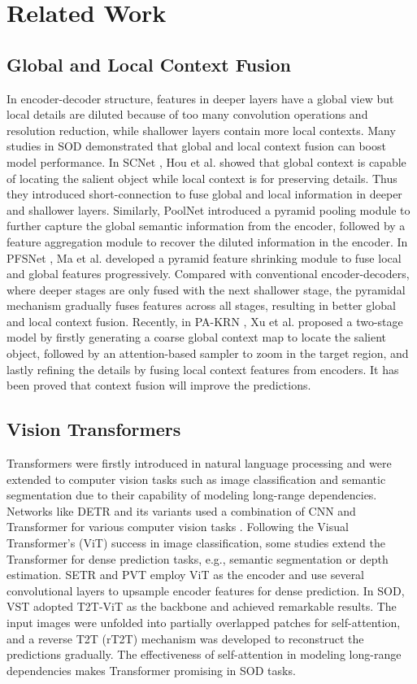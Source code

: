 \documentclass[letterpaper]{article} \usepackage{aaai22}  \usepackage{times}  \usepackage{helvet}  \usepackage{courier}  \usepackage[hyphens]{url}  \usepackage{graphicx} \urlstyle{rm} \def\UrlFont{\rm}  \usepackage{natbib}  \usepackage{caption} \DeclareCaptionStyle{ruled}{labelfont=normalfont,labelsep=colon,strut=off} \frenchspacing  \setlength{\pdfpagewidth}{8.5in}  \setlength{\pdfpageheight}{11in}  \usepackage{algorithm}
\begin{document}
\section{Related Work}
\subsection{Global and Local Context Fusion}
In encoder-decoder structure, features in deeper layers have a global view but local details are diluted because of too many convolution operations and resolution reduction, while shallower layers contain more local contexts. Many studies in SOD demonstrated that global and local context fusion can boost model performance. In SCNet \cite{SCNET}, Hou et al. showed that global context is capable of locating the salient object while local context is for preserving details. Thus they introduced short-connection to fuse global and local information in deeper and shallower layers. Similarly, PoolNet \cite{POOLNET} introduced a pyramid pooling module to further capture the global semantic information from the encoder, followed by a feature aggregation module to recover the diluted information in the encoder. In PFSNet \cite{PFSNET}, Ma et al. developed a pyramid feature shrinking module to fuse local and global features progressively. Compared with conventional encoder-decoders, where deeper stages are only fused with the next shallower stage, the pyramidal mechanism gradually fuses features across all stages, resulting in better global and local context fusion. Recently, in PA-KRN \cite{PAKRN}, Xu et al. proposed a two-stage model by firstly generating a coarse global context map to locate the salient object, followed by an attention-based sampler to zoom in the target region, and lastly refining the details by fusing local context features from encoders. It has been proved that context fusion will improve the predictions.

\subsection{Vision Transformers}
Transformers were firstly introduced in natural language processing \cite{ATTN, BERT, ALBERT} and were extended to computer vision tasks such as image classification \cite{16X16} and semantic segmentation \cite{SETR} due to their capability of modeling long-range dependencies. Networks like DETR \cite{DETR} and its variants \cite{UPDETR, HOTR} used a combination of CNN and Transformer for various computer vision tasks \cite{TMT, PAT}. Following the Visual Transformer's (ViT) success in image classification, some studies extend the Transformer for dense prediction tasks, e.g., semantic segmentation or depth estimation. SETR \cite{SETR} and PVT \cite{PVT} employ ViT as the encoder and use several convolutional layers to upsample encoder features for dense prediction. In SOD, VST \cite{VST} adopted T2T-ViT \cite{T2TVIT} as the backbone and achieved remarkable results. The input images were unfolded into partially overlapped patches for self-attention, and a reverse T2T (rT2T) mechanism was developed to reconstruct the predictions gradually. The effectiveness of self-attention in modeling long-range dependencies makes Transformer promising in SOD tasks.
\end{document}
